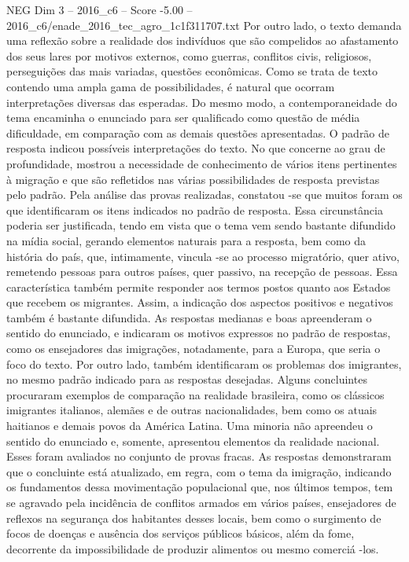 \begin{textsample}{NEG Dim 3 – 2016\_c6 – Score -5.00 – 2016\_c6/enade\_2016\_tec\_agro\_1c1f311707.txt}
Por outro lado, o texto demanda uma reflexão sobre a realidade dos indivíduos que são compelidos ao afastamento dos seus lares por motivos externos, como guerras, conflitos civis, religiosos, perseguições das mais variadas, questões econômicas.
Como se trata de texto contendo uma ampla gama de possibilidades, é natural que ocorram interpretações diversas das esperadas.
Do mesmo modo, a contemporaneidade do tema encaminha o enunciado para ser qualificado como questão de média dificuldade, em comparação com as demais questões apresentadas.
O padrão de resposta indicou possíveis interpretações do texto.
No que concerne ao grau de profundidade, mostrou a necessidade de conhecimento de vários itens pertinentes à migração e que são refletidos nas várias possibilidades de resposta previstas pelo padrão.
Pela análise das provas realizadas, constatou -se que muitos foram os que identificaram os itens indicados no padrão de resposta.
Essa circunstância poderia ser justificada, tendo em vista que o tema vem sendo bastante difundido na mídia social, gerando elementos naturais para a resposta, bem como da história do país, que, intimamente, vincula -se ao processo migratório, quer ativo, remetendo pessoas para outros países, quer passivo, na recepção de pessoas.
Essa característica também permite responder aos termos postos quanto aos Estados que recebem os migrantes.
Assim, a indicação dos aspectos positivos e negativos também é bastante difundida.
As respostas medianas e boas apreenderam o sentido do enunciado, e indicaram os motivos expressos no padrão de respostas, como os ensejadores das imigrações, notadamente, para a Europa, que seria o foco do texto.
Por outro lado, também identificaram os problemas dos imigrantes, no mesmo padrão indicado para as respostas desejadas.
Alguns concluintes procuraram exemplos de comparação na realidade brasileira, como os clássicos imigrantes italianos, alemães e de outras nacionalidades, bem como os atuais haitianos e demais povos da América Latina.
Uma minoria não apreendeu o sentido do enunciado e, somente, apresentou elementos da realidade nacional.
Esses foram avaliados no conjunto de provas fracas.
As respostas demonstraram que o concluinte está atualizado, em regra, com o tema da imigração, indicando os fundamentos dessa movimentação populacional que, nos últimos tempos, tem se agravado pela incidência de conflitos armados em vários países, ensejadores de reflexos na segurança dos habitantes desses locais, bem como o surgimento de focos de doenças e ausência dos serviços públicos básicos, além da fome, decorrente da impossibilidade de produzir alimentos ou mesmo comerciá -los.

\end{textsample}
